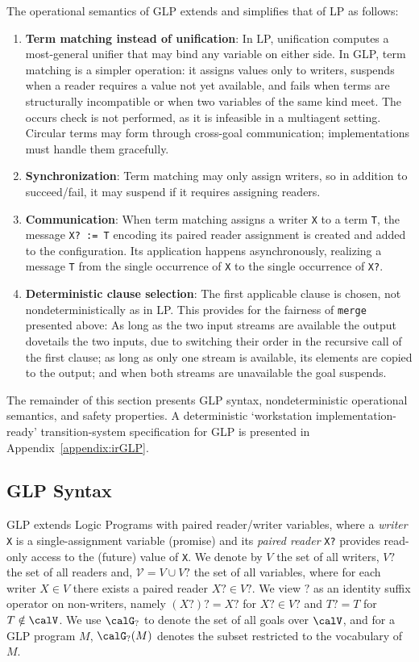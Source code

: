 The operational semantics of GLP extends and simplifies that of LP as follows:
\begin{enumerate}
\item \textbf{Term matching instead of unification}: In LP, unification computes a most-general unifier that may bind any variable on either side. In GLP, term matching is a simpler operation: it assigns values only to writers, suspends when a reader requires a value not yet available, and fails when terms are structurally incompatible or when two variables of the same kind meet. The occurs check is not performed, as it is infeasible in a multiagent setting. Circular terms may form through cross-goal communication; implementations must handle them gracefully.

\item \textbf{Synchronization}: Term matching may only assign writers, so in addition to succeed/fail, it may suspend if it requires assigning readers.

\item \textbf{Communication}: When term matching assigns a writer \verb|X| to a term \verb|T|, the message \verb|X? := T| encoding its paired reader assignment is created and added to the configuration. Its application happens asynchronously, realizing a message \verb|T| from the single occurrence of \verb|X| to the single occurrence of \verb|X?|.

\item \textbf{Deterministic clause selection}: The first applicable clause is chosen, not nondeterministically as in LP. This provides for the fairness of \verb|merge| presented above: As long as the two input streams are available the output dovetails the two inputs, due to switching their order in the recursive call of the first clause; as long as only one stream is available, its elements are copied to the output; and when both streams are unavailable the goal suspends.
\end{enumerate}

The remainder of this section presents GLP syntax, nondeterministic operational semantics, and safety properties. A deterministic `workstation implementation-ready' transition-system specification for GLP is presented in Appendix~\ref{appendix:irGLP}.

\subsection{GLP Syntax}

GLP extends Logic Programs with paired reader/writer variables, where a \emph{writer} \verb|X| is a single-assignment variable (promise) and its \emph{paired reader} \verb|X?| provides read-only access to the (future) value of \verb|X|. We denote by $V$ the set of all writers, $V?$ the set of all readers and, $\mathcal{V} = V \cup V?$ the set of all variables, where for each writer $X \in V$ there exists a paired reader $X? \in V?$.
We view $?$ as an identity suffix operator on non-writers, namely $(X?)?=X?$ for $X?\in V?$ and $T?=T$ for $T\notin \calV$.
We use $\calG_?$ to denote the set of all goals over $\calV$, and for a GLP program $M$, $\calG_?(M)$ denotes the subset restricted to the vocabulary of $M$.

